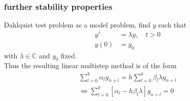 	
	\subsubsection{further stability properties}
	
	\begin{frame}
		Dahlquist test problem as a model problem, find $y$ such that
		\begin{align}
			y' &= \lambda y, \quad t > 0 \\
			y(0) &= y_0
		\end{align}
		with $\lambda \in \mathbb{C}$ and $y_0$ fixed. \\
		Thus the resulting linear multistep method is of the form
		\begin{align*}
			\sum_{l=0}^{k} \alpha_l y_{n+l} = h \sum_{l=0}^{k} \beta_l \lambda y_{n+l} \\
			\iff \sum_{l=0}^{k}  [\alpha_l - h \beta_l \lambda] y_{n+l} = 0
		\end{align*}
	\end{frame}
	
